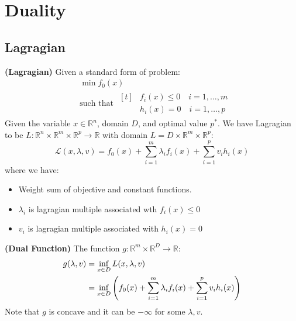 \section{Duality}

\subsection{Lagragian}

\begin{definition}{\textbf{(Lagragian)}}
    Given a standard form of problem:
    \begin{equation*}
    \begin{aligned}
        &\min f_0(x) \\
        &\text{such that } \begin{aligned}[t]
            &f_i(x)\le0 \quad i=1,\dots,m \\
            &h_i(x)=0 \quad i=1,\dots,p
        \end{aligned}
    \end{aligned}
    \end{equation*}
    Given the variable $x\in \mathbb{R}^n$, domain $D$, and optimal value $p^*$. We have Lagragian to be $L:\mathbb{R}^n\times \mathbb{R}^m\times \mathbb{R}^p \rightarrow \mathbb{R}$ with domain $L = D \times \mathbb{R}^m \times \mathbb{R}^p$:
    \begin{equation*}
        \mathcal{L}(x,\lambda, v) = f_0(x) + \sum^m_{i=1}\lambda_if_i(x) + \sum^p_{i=1}v_ih_i(x)
    \end{equation*}
    where we have:
    \begin{itemize}
        \item Weight sum of objective and constant functions.
        \item $\lambda_i$ is lagragian multiple associated wth $f_i(x)\le0$
        \item $v_i$ is lagragian multiple associated with $h_i(x)=0$
    \end{itemize}
\end{definition}

\begin{definition}{\textbf{(Dual Function)}}
    The function $g:\mathbb{R}^m\times \mathbb{R}^D\rightarrow \mathbb{R}$:
    \begin{equation*}
    \begin{aligned}
        g(\lambda, v) &= \inf_{x\in D}L(x,\lambda,v) \\
        &= \inf_{x\in D}\left(  f_0(x) + \sum^m_{i=1}\lambda_i f_i(x) + \sum^p_{i=1}v_ih_i(x)  \right)
    \end{aligned}
    \end{equation*}
    Note that $g$ is concave and it can be $-\infty$ for some $\lambda, v$.
\end{definition}

